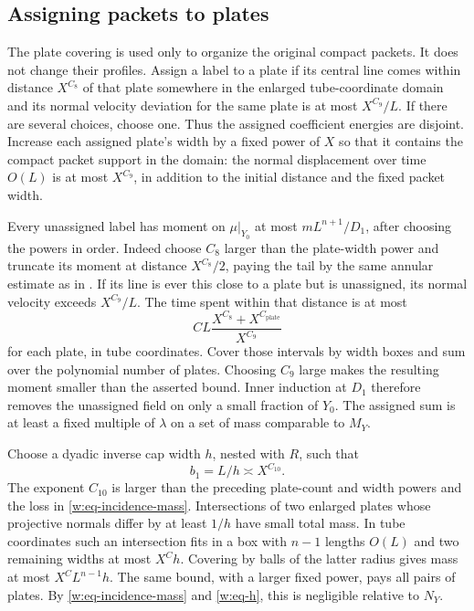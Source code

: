 \subsection{Assigning packets to plates}\label{w:assignment}

The plate covering is used only to organize the original compact
packets.  It does not change their profiles.  Assign a label to a plate
if its central line comes within distance $X^{C_8}$ of that plate
somewhere in the enlarged tube-coordinate domain and its normal
velocity deviation for the same plate is at most $X^{C_9}/L$.
If there are several choices, choose one.  Thus the assigned coefficient
energies are disjoint.  Increase each assigned plate's width by a fixed
power of $X$ so that it contains the compact packet support in the
domain: the normal displacement over time $O(L)$ is at most $X^{C_9}$,
in addition to the initial distance and the fixed packet width.

Every unassigned label has moment on $\mu|_{Y_0}$ at most
$mL^{n+1}/D_1$, after choosing the powers in order.  Indeed choose
$C_8$ larger than the plate-width power and truncate its moment at
distance $X^{C_8}/2$, paying the tail by the same annular estimate as
in .  If its line is ever this close to a
plate but is unassigned, its normal velocity exceeds $X^{C_9}/L$.
The time spent within that distance is at most
\[
 CL\frac{X^{C_8}+X^{C_{\mathrm{plate}}}}{X^{C_9}}
\]
for each plate, in tube coordinates.  Cover those intervals by width
boxes and sum over the polynomial number of plates.  Choosing $C_9$
large makes the resulting moment smaller than the asserted bound.
Inner induction at $D_1$ therefore removes the unassigned field on
only a small fraction of $Y_0$.  The assigned sum is at least a fixed
multiple of $\lambda$ on a set of mass comparable to $M_Y$.

Choose a dyadic inverse cap width $h$, nested with $R$, such that
\begin{equation}\label{w:eq-h}
 b_1=L/h\asymp X^{C_{10}}.
\end{equation}
The exponent $C_{10}$ is larger than the preceding plate-count and
width powers and the loss in \eqref{w:eq-incidence-mass}.  Intersections
of two enlarged plates whose projective normals differ by at least
$1/h$ have small total mass.  In tube coordinates such an intersection
fits in a box with $n-1$ lengths $O(L)$ and two remaining widths at
most $X^Ch$.  Covering by balls of the latter radius gives mass at most
$X^CL^{n-1}h$.  The same bound, with a larger fixed power, pays all
pairs of plates.  By \eqref{w:eq-incidence-mass} and
\eqref{w:eq-h}, this is negligible relative to $N_Y$.

